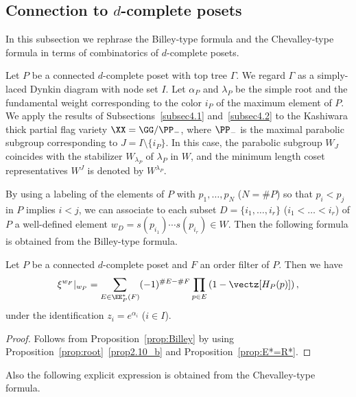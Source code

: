 \subsection{%
Connection to \texorpdfstring{$d$}{d}-complete posets
}\label{subsec4.3}

In this subsection we rephrase the Billey-type formula and the Chevalley-type formula 
in terms of combinatorics of $d$-complete posets.

Let $P$ be a connected $d$-complete poset with top tree $\Gamma$.
We regard $\Gamma$ as a simply-laced Dynkin diagram with node set $I$.
Let $\alpha_P$ and $\lambda_P$ be the simple root and the fundamental weight 
corresponding to the color $i_P$ of the maximum element of $P$.
We apply the results of Subsections~\ref{subsec4.1} and~\ref{subsec4.2} 
to the Kashiwara thick partial flag variety 
$\XX = \GG/\PP_-$, where $\PP_-$ is the maximal parabolic subgroup corresponding 
to $J = I \setminus \{ i_P \}$.
In this case, the parabolic subgroup $W_J$ coincides with the stabilizer $W_{\lambda_P}$ of $\lambda_P$ in $W$, 
and the minimum length coset representatives $W^J$ is denoted by $W^{\lambda_P}$.

By using a labeling of the elements of $P$ with $p_1, \ldots, p_N$ ($N= \# P$) 
so that $p_i < p_j$ in $P$ implies $i<j$, 
we can associate to each subset $D = \{ i_1, \dots, i_r \}$ ($i_1 < \dots < i_r$) of $P$ 
a well-defined element $w_D = s(p_{i_1}) \cdots s(p_{i_r}) \in W$.
Then the following formula is obtained from the Billey-type formula.

\begin{prop}
\label{prop:Billey_P}
Let $P$ be a connected $d$-complete poset and $F$ an order filter of $P$.
Then we have
\begin{equation}
\label{eq:Billey_P}
\xi^{w_F}|_{w_P}
 =
\sum_{E \in \EE^*_P(F)}
 (-1)^{\# E - \# F}
 \prod_{p \in E} \left( 1 - \vectz[H_P(p)] \right),
\end{equation}
under the identification $z_i = e^{\alpha_i}$ \textup{(}$i \in I$\textup{)}.
\end{prop}

\begin{proof}
Follows from Proposition~\ref{prop:Billey} 
by using Proposition~\ref{prop:root}~\ref{prop2.10_b} and Proposition~\ref{prop:E*=R*}.
\end{proof}

Also the following explicit expression is obtained from the Chevalley-type formula.

